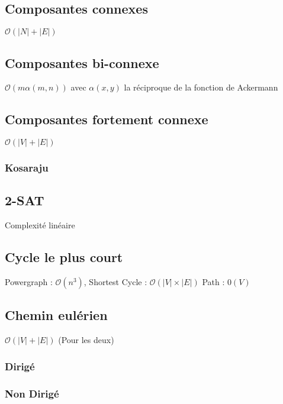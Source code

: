 \documentclass[8pt]{article}
\begin{document}
        \subsection{Composantes connexes}
        $\mathcal{O}(\lvert N \rvert  + \lvert E \rvert)$
        {\scriptsize}
        \subsection{Composantes bi-connexe}
        $\mathcal{O}(m \alpha(m,n))$ avec $\alpha(x,y)$ la réciproque de la fonction de Ackermann 
        {\scriptsize}
        \subsection{Composantes fortement connexe}
            $\mathcal{O}(\lvert V \rvert  + \lvert E \rvert)$
            \subsubsection{Kosaraju}
            {\scriptsize}
        \subsection{2-SAT}
        Complexité linéaire
        {\scriptsize}
        \subsection{Cycle le plus court}
        Powergraph : $\mathcal{O}(n^3)$, Shortest Cycle : $\mathcal{O}(\lvert V \rvert  \times \lvert E \rvert)$ 
        Path : $\mathcal{0}(V)$
        {\scriptsize}
        \subsection{Chemin eulérien}
            $\mathcal{O}(\lvert V \rvert  + \lvert E \rvert)$ (Pour les deux)
            \subsubsection{Dirigé}
            {\scriptsize}
            \subsubsection{Non Dirigé}
            {\scriptsize}
\end{document}
